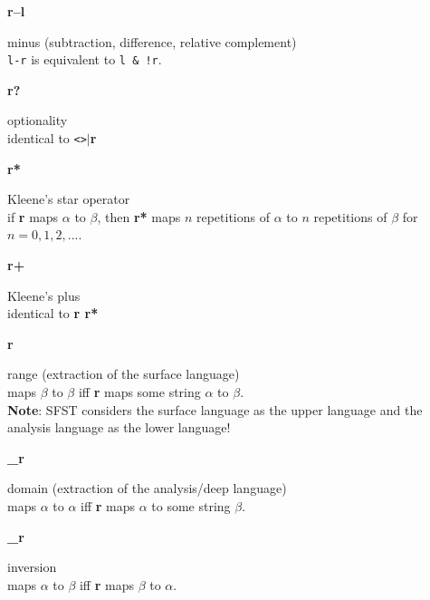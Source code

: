 \documentclass{article}
\begin{document}
\parbox[t]{1cm}{\textbf{r--l}}
\begin{minipage}[t]{13cm}
  minus (subtraction, difference, relative complement)\\
  \verb#l-r# is equivalent to \verb#l & !r#.\\
\end{minipage}

\parbox[t]{1cm}{\textbf{r?}}
\begin{minipage}[t]{13cm}
  optionality\\
  identical to \verb#<>#\textbf{$|$r}\\
\end{minipage}

\parbox[t]{1cm}{\textbf{r*}}
\begin{minipage}[t]{13cm}
  Kleene's star operator\\
  if \textbf{r} maps $\alpha$ to $\beta$, then \textbf{r*} maps $n$
  repetitions of $\alpha$ to $n$ repetitions of $\beta$
  for $n=0,1,2,...$.\\
\end{minipage}

\parbox[t]{1cm}{\textbf{r+}}
\begin{minipage}[t]{13cm}
  Kleene's plus\\
  identical to \textbf{r r*}\\
\end{minipage}
  
\parbox[t]{1cm}{\textbf{r}}
\begin{minipage}[t]{13cm}
  range (extraction of the surface language)\\
  maps $\beta$ to $\beta$ iff \textbf{r} maps some string $\alpha$ to
  $\beta$.\\
  \textbf{Note}: SFST considers the surface language as the upper
  language and the analysis language as the lower language!
\end{minipage}

\parbox[t]{1cm}{\textbf{\_r}}
\begin{minipage}[t]{13cm}
  domain (extraction of the analysis/deep language)\\
  maps $\alpha$ to $\alpha$ iff \textbf{r} maps $\alpha$ to some
  string $\beta$.\\
\end{minipage}

\parbox[t]{1cm}{\textbf{\_r}}
\begin{minipage}[t]{13cm}
  inversion\\
  maps $\alpha$ to $\beta$ iff \textbf{r} maps $\beta$ to $\alpha$.\\
\end{minipage}
\end{document}
